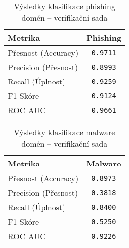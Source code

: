 \begin{table}[H]
\centering
\begin{tabular}{|l|c|}
\hline
\textbf{Metrika} & \textbf{Phishing} \\
\hline
Přesnost (Accuracy) & \texttt{0.9711} \\
Precision (Přesnost) & \texttt{0.8993} \\
Recall (Úplnost) & \texttt{0.9259} \\
F1 Skóre & \texttt{0.9124} \\
ROC AUC & \texttt{0.9661} \\
\hline
\end{tabular}
\caption{Výsledky klasifikace phishing domén – verifikační sada}
\label{tab:final_pipeline_ver_phishing_2}
\end{table}

\begin{table}[H]
\centering
\begin{tabular}{|l|c|}
\hline
\textbf{Metrika} & \textbf{Malware} \\
\hline
Přesnost (Accuracy) & \texttt{0.8973} \\
Precision (Přesnost) & \texttt{0.3818} \\
Recall (Úplnost) & \texttt{0.8400} \\
F1 Skóre & \texttt{0.5250} \\
ROC AUC & \texttt{0.9226} \\
\hline
\end{tabular}
\caption{Výsledky klasifikace malware domén – verifikační sada}
\label{tab:final_pipeline_ver_malware_2}
\end{table}

